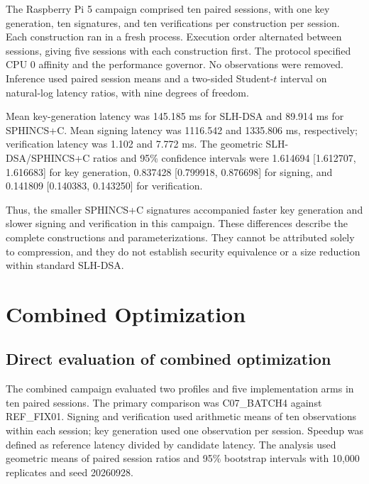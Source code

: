 \documentclass[pdflatex,sn-mathphys-num]{sn-jnl}
\begin{document}
The Raspberry Pi 5 campaign comprised ten paired sessions,
with one key generation, ten signatures, and ten verifications
per construction per session. Each construction ran in a fresh
process. Execution order alternated between sessions, giving
five sessions with each construction first. The protocol
specified CPU 0 affinity and the performance governor.
No observations were removed. Inference used paired session
means and a two-sided Student-$t$ interval on natural-log
latency ratios, with nine degrees of freedom.

Mean key-generation latency was 145.185 ms for SLH-DSA and
89.914 ms for SPHINCS+C. Mean signing latency was 1116.542
and 1335.806 ms, respectively; verification latency was
1.102 and 7.772 ms. The geometric SLH-DSA/SPHINCS+C ratios
and 95\% confidence intervals were 1.614694
[1.612707, 1.616683] for key generation, 0.837428
[0.799918, 0.876698] for signing, and 0.141809
[0.140383, 0.143250] for verification.

Thus, the smaller SPHINCS+C signatures accompanied faster
key generation and slower signing and verification in this
campaign. These differences describe the complete constructions
and parameterizations. They cannot be attributed solely to
compression, and they do not establish security equivalence
or a size reduction within standard SLH-DSA.





\section{Combined Optimization}
\label{sec:combined}

\subsection{Direct evaluation of combined optimization}
\label{subsec:o9_combined_review}

The combined campaign evaluated two profiles and five implementation
arms in ten paired sessions. The primary comparison was C07\_BATCH4
against REF\_FIX01. Signing and verification used arithmetic means of
ten observations within each session; key generation used one
observation per session. Speedup was defined as reference latency
divided by candidate latency. The analysis used geometric means of
paired session ratios and 95\% bootstrap intervals with 10,000
replicates and seed 20260928.
\end{document}
